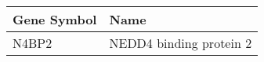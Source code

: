 \begin{tabular}{ll}
\toprule
Gene Symbol &                    Name \\
\midrule
      N4BP2 & NEDD4 binding protein 2 \\
\bottomrule
\end{tabular}

